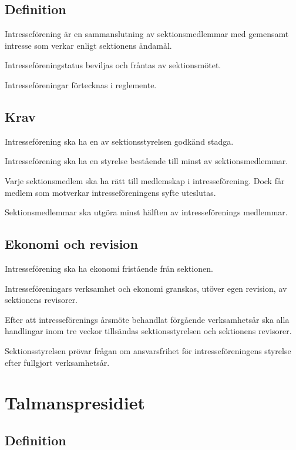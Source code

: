\documentclass{styrdokument}
\begin{document}
\subsection{Definition}

\? Intresseförening är en sammanslutning av sektionsmedlemmar med gemensamt intresse som verkar enligt sektionens ändamål.

\? Intresseföreningstatus beviljas och fråntas av sektionsmötet.

\? Intresseföreningar förtecknas i reglemente.

\subsection{Krav}

\? Intresseförening ska ha en av sektionsstyrelsen godkänd stadga.

\? Intresseförening ska ha en styrelse bestående till minst  av sektionsmedlemmar.

\? Varje sektionsmedlem ska ha rätt till medlemskap i intresseförening.
Dock får medlem som motverkar intresseföreningens syfte uteslutas.
\label{ratt.intressef}

\? Sektionsmedlemmar ska utgöra minst hälften av intresseförenings medlemmar.

\subsection{Ekonomi och revision}

\? Intresseförening ska ha ekonomi fristående från sektionen.

\? Intresseföreningars verksamhet och ekonomi granskas, utöver egen revision, av sektionens revisorer.

\? Efter att intresseförenings årsmöte behandlat förgående verksamhetsår ska alla handlingar inom tre veckor tillsändas sektionsstyrelsen och sektionens revisorer.

\? Sektionsstyrelsen prövar frågan om ansvarsfrihet för intresseföreningens styrelse efter fullgjort verksamhetsår.

\section{Talmanspresidiet}
\subsection{Definition}
\end{document}
